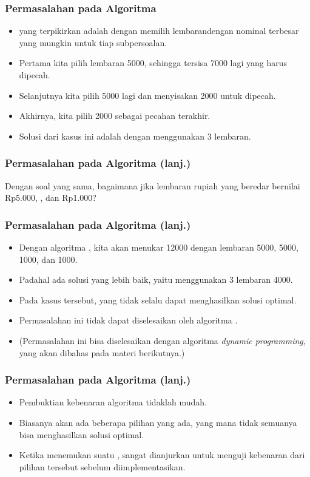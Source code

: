 \begin{frame}
  \frametitle{Permasalahan pada Algoritma \fGreedy}
  \begin{itemize}
    \item \fGreedyChoice yang terpikirkan adalah dengan memilih lembarandengan nominal terbesar yang mungkin untuk tiap subpersoalan.
    \item Pertama kita pilih lembaran 5000, sehingga tersisa 7000 lagi yang harus dipecah.
    \item Selanjutnya kita pilih 5000 lagi dan menyisakan 2000 untuk dipecah.
    \item Akhirnya, kita pilih 2000 sebagai pecahan terakhir.
    \item Solusi dari kasus ini adalah dengan menggunakan 3 lembaran.
  \end{itemize}
\end{frame}

\begin{frame}
  \frametitle{Permasalahan pada Algoritma \fGreedy (lanj.)}
  \begin{center}
    Dengan soal yang sama, bagaimana jika lembaran rupiah yang beredar bernilai  Rp5.000, , dan Rp1.000?
  \end{center}
\end{frame}

\begin{frame}
  \frametitle{Permasalahan pada Algoritma \fGreedy (lanj.)}
  \begin{itemize}
    \item Dengan algoritma \fgreedy, kita akan menukar  12000 dengan lembaran 5000, 5000, 1000, dan 1000.
    \item Padahal ada solusi yang lebih baik, yaitu menggunakan 3 lembaran 4000.
    \item Pada kasus tersebut, \fgreedyChoice yang tidak selalu dapat menghasilkan solusi optimal.
    \item Permasalahan ini tidak dapat diselesaikan oleh algoritma \fgreedy.
    \item (Permasalahan ini bisa diselesaikan dengan algoritma \textit{dynamic programming}, yang akan dibahas pada materi berikutnya.)
  \end{itemize}
\end{frame}

\begin{frame}
  \frametitle{Permasalahan pada Algoritma \fGreedy (lanj.)}
  \begin{itemize}
    \item Pembuktian kebenaran algoritma \fgreedy tidaklah mudah.
    \item Biasanya akan ada beberapa pilihan  \fgreedyChoice yang ada, yang mana tidak semuanya bisa menghasilkan solusi optimal.
    \item Ketika menemukan suatu \fgreedyChoice, sangat dianjurkan untuk menguji kebenaran dari pilihan tersebut sebelum diimplementasikan.
  \end{itemize}
\end{frame}

